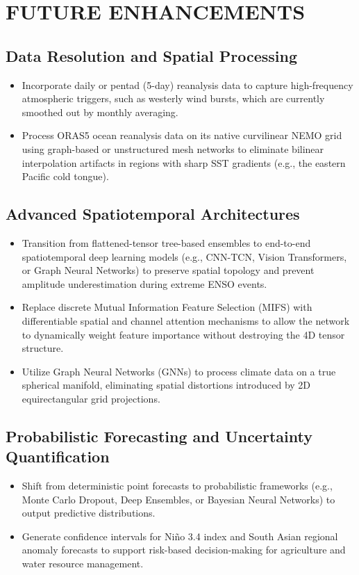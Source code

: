 \chapter{FUTURE ENHANCEMENTS}
\label{chap:future-work}

\section{Data Resolution and Spatial Processing}
\begin{itemize}
    \item Incorporate daily or pentad (5-day) reanalysis data to capture high-frequency atmospheric triggers, such as westerly wind bursts, which are currently smoothed out by monthly averaging.
    \item Process ORAS5 ocean reanalysis data on its native curvilinear NEMO grid using graph-based or unstructured mesh networks to eliminate bilinear interpolation artifacts in regions with sharp SST gradients (e.g., the eastern Pacific cold tongue).
\end{itemize}

\section{Advanced Spatiotemporal Architectures}
\begin{itemize}
    \item Transition from flattened-tensor tree-based ensembles to end-to-end spatiotemporal deep learning models (e.g., CNN-TCN, Vision Transformers, or Graph Neural Networks) to preserve spatial topology and prevent amplitude underestimation during extreme ENSO events.
    \item Replace discrete Mutual Information Feature Selection (MIFS) with differentiable spatial and channel attention mechanisms to allow the network to dynamically weight feature importance without destroying the 4D tensor structure.
    \item Utilize Graph Neural Networks (GNNs) to process climate data on a true spherical manifold, eliminating spatial distortions introduced by 2D equirectangular grid projections.
\end{itemize}

\section{Probabilistic Forecasting and Uncertainty Quantification}
\begin{itemize}
    \item Shift from deterministic point forecasts to probabilistic frameworks (e.g., Monte Carlo Dropout, Deep Ensembles, or Bayesian Neural Networks) to output predictive distributions.
    \item Generate confidence intervals for Ni\~{n}o 3.4 index and South Asian regional anomaly forecasts to support risk-based decision-making for agriculture and water resource management.
\end{itemize}

